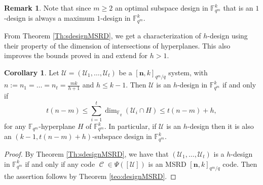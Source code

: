 \documentclass[11pt]{amsart}
\DeclareMathOperator{\C}{\mathcal{C}}
\theoremstyle{definition}
\newtheorem{corollary}[theorem]{Corollary}
\newtheorem{remark}[theorem]{Remark}
\newcommand{\F}{{\mathbb F}}
\newcommand{\U}{{\mathcal{U}}}
\newcommand{\bfn}{\mathbf {n}}
\begin{document}
\begin{remark}
    Note that since $m \geq 2$ an optimal subspace design in $\F_{q^m}^k$ that is an $1$-design is always a maximum $1$-design in $\F_{q^m}^k$.
\end{remark}


From Theorem \ref{Th:sdesignMSRD}, we get a characterization of $h$-design using their property of the dimension of intersections of hyperplanes. This also improves the bounds proved in \cite[Corollary 5.11]{santonastaso2022subspace} and extend \cite[Theorem 7.3]{santonastaso2022subspace} for $h>1$.


\begin{corollary} \label{Cor:hdesignhyper}
Let $\U=(\mathcal{U}_1,\ldots,\mathcal{U}_t)$ be a $[\bfn,k]_{q^m/q}$ system, with $n:=n_1=\ldots=n_t=\frac{mk}{h+1}$ and $h \leq k-1$. Then $\U$ is an $h$-design in $\F_{q^m}^k$ if and only if
\[
t \left( n-m \right) \leq \sum_{i=1}^t \dim_{\F_q}(\mathcal{U}_i \cap H) \leq t \left(n-m \right)+h,
\]
for any $\F_{q^m}$-hyperplane $H$ of $\F_{q^m}^k$. In particular, if $\mathcal{U}$ is an $h$-design then it is also an \newline $\left(k-1, t \left(n-m \right)+h\right)$-subspace design in $\F_{q^m}^k$.
\end{corollary}

\begin{proof}
    By Theorem \ref{Th:sdesignMSRD}, we have that $(\mathcal{U}_1,\ldots,\mathcal{U}_t)$ is a $h$-design in $\F_{q^m}^k$ if and only if any code $\C \in \Psi([\mathcal{U}])$ is an MSRD $[\bfn,k]_{q^m/q}$ code. Then the assertion follows by Theorem \ref{teo:designMSRD}.
\end{proof}
\end{document}
